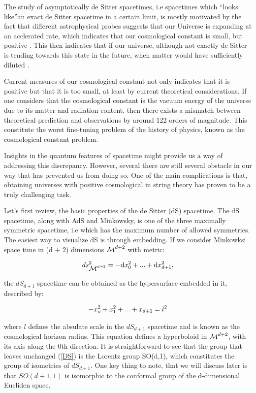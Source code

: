 \documentclass[11pt,a4paper]{article}
\begin{document}
The study of asymptotically de Sitter spacetimes, i.e spacetimes which \textquotedblleft looks like\textquotedblright an exact de Sitter spacetime in a certain limit, is mostly motivated by the fact that different astrophysical probes suggests that our Universe is expanding at an acclerated rate, which indicates that our cosmological constant is small, but positive \cite{2013PhR...530...87W}. This then indicates that if our universe, although not exactly de Sitter is tending towards this state in the future, when matter would have sufficiently diluted \cite{PhysRevD.28.2118}. 

Current measures of our cosmological constant not only indicates that it is positive but that it is too small, at least by current theoretical considerations. If one considers that the cosmological constant is the vacuum energy of the universe due to its matter and radiation content, then there exists a mismatch between theoretical prediction and observations by around 122 orders of magnitude. This constitute the worst fine-tuning problem of the history of physics, known as the cosmological constant problem.

Insights in the quantum features of spacetime might provide us a way of addressing this discrepancy. However, several there are still several obstacle in our way that has prevented us from doing so. One of the main complications is that, obtaining universes with positive cosmological in string theory has proven to be a truly challenging task.

Let's first review, the basic properties of the de Sitter (dS) spacetime. The dS spacetime, along with AdS and Minkowsky, is one of the three maximally symmetric spacetime, i.e which has the maximum number of allowed symmetries. The easiest way to visualize dS is through embedding. If we consider Minkowksi space time in (d + 2) dimensions $\mbox{${\cal M}$}^{d+2}$ with metric:

\begin{equation}
    ds^2_{\mbox{${\cal M}$}^{d+2}} = -\mathrm{d} x_0^2 + ... + \mathrm{d} x_{d+1}^2,
\end{equation}

{\noindent the $dS_{d+1}$ spacetime can be obtained as the hypersurface embedded in it, described by:}

\begin{equation}\LA{DS}
    -x_o^2+x_1^2+...+x_{d+1} = l^2
\end{equation}

{\noindent where $l$ defines the absulate scale in the $dS_{d+1}$ spacetime and is known as the cosmological horizon radius. This equation defines a hyperboloid in $\mbox{${\cal M}$}^{d+2}$, with its axis along the 0th direction. It is straightforward to see that the group that leaves unchanged (\ref{DS}) is the Lorentz group SO(d,1), which constitutes the group of isometries of $dS_{d+1}$. One key thing to note, that we will discuss later is that $SO(d+1,1)$ is isomorphic to the conformal group of the d-dimensional Eucliden space.}
\end{document}
